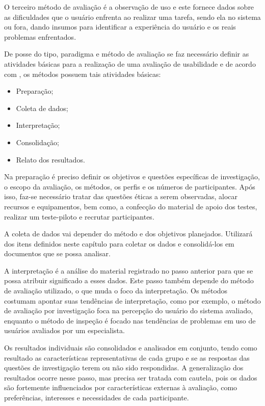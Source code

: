O terceiro método de avaliação é a observação de uso e este fornece dados sobre as dificuldades que o usuário enfrenta ao realizar uma tarefa, sendo ela no sistema ou fora, dando insumos para identificar a experiência do usuário e os reais problemas enfrentados.

De posse do tipo, paradigma e método de avaliação se faz necessário definir as atividades básicas para a realização de uma avaliação de usabilidade e de acordo com \cite{diniz2010}, os métodos possuem tais atividades básicas:
\begin{itemize}
	\item{Preparação;}
	\item{Coleta de dados;}
	\item{Interpretação;}
	\item{Consolidação;}
	\item{Relato dos resultados.}
\end{itemize}

Na preparação é preciso definir os objetivos e questões específicas de investigação, o escopo da avaliação, os métodos, os perfis e os números de participantes. Após isso, faz-se necessário tratar das questões éticas a serem observadas, alocar recursos e equipamentos, bem como, a confecção do material de apoio dos testes, realizar um teste-piloto e recrutar participantes.

A coleta de dados vai depender do método e dos objetivos planejados. Utilizará dos itens definidos neste capítulo para coletar os dados e consolidá-los em documentos que se possa analisar.

A interpretação é a análise do material registrado no passo anterior para que se possa atribuir significado a esses dados. Este passo também depende do método de avaliação utilizado, o que muda o foco da interpretação. Os métodos costumam apontar suas tendências de interpretação, como por exemplo, o método de avaliação por investigação foca na percepção do usuário do sistema avaliado, enquanto o método de inspeção é focado nas tendências de problemas em uso de usuários avaliados por um especialista.

Os resultados individuais são consolidados e analisados em conjunto, tendo como resultado as características representativas de cada grupo e se as respostas das questões de investigação terem ou não sido respondidas. A generalização dos resultados ocorre nesse passo, mas precisa ser tratada com cautela, pois os dados são fortemente influenciados por características externas à avaliação, como preferências, interesses e necessidades de cada participante.

